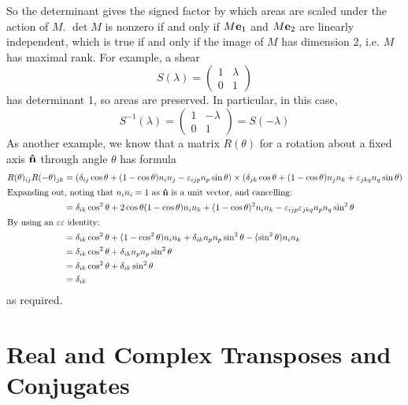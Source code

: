 \documentclass{article}
\begin{document}
So the determinant gives the signed factor by which areas are scaled under the action of $M$. $\det M$ is nonzero if and only if $M\vb e_1$ and $M\vb e_2$ are linearly independent, which is true if and only if the image of $M$ has dimension 2, i.e. $M$ has maximal rank. For example, a shear
\[ S(\lambda) = \begin{pmatrix}
		1 & \lambda \\ 0 & 1
	\end{pmatrix} \]
has determinant 1, so areas are preserved. In particular, in this case,
\[ S^{-1}(\lambda) = \begin{pmatrix}
		1 & -\lambda \\ 0 & 1
	\end{pmatrix} = S(-\lambda) \]
As another example, we know that a matrix $R(\theta)$ for a rotation about a fixed axis $\vu n$ through angle $\theta$ has formula
\begin{align*}
	R(\theta)_{ij} R(-\theta)_{jk} & = (\delta_{ij}\cos \theta + (1 - \cos \theta) n_i n_j - \varepsilon_{ijp}n_p \sin \theta) \times (\delta_{jk}\cos \theta + (1 - \cos \theta) n_j n_k + \varepsilon_{jkq}n_q \sin \theta) \\
	\intertext{Expanding out, noting that $n_in_i = 1$ as $\vu n$ is a unit vector, and cancelling:}
	                               & = \delta_{ik} \cos^2 \theta + 2\cos \theta(1 - \cos \theta) n_in_k + (1 - \cos \theta)^2n_in_k - \varepsilon_{ijp}\varepsilon_{jkq} n_p n_q \sin^2 \theta                                \\
	\intertext{By using an $\varepsilon\varepsilon$ identity:}
	                               & = \delta_{ik}\cos^2\theta + (1 - \cos^2 \theta)n_in_k + \delta_{ik}n_pn_p \sin^2 \theta - (\sin^2 \theta)n_in_k                                                                          \\
	                               & = \delta_{ik}\cos^2\theta + \delta_{ik}n_pn_p \sin^2 \theta                                                                                                                              \\
	                               & = \delta_{ik}\cos^2\theta + \delta_{ik} \sin^2 \theta                                                                                                                                    \\
	                               & = \delta_{ik}
\end{align*}
as required.

\section{Real and Complex Transposes and Conjugates}
\end{document}
